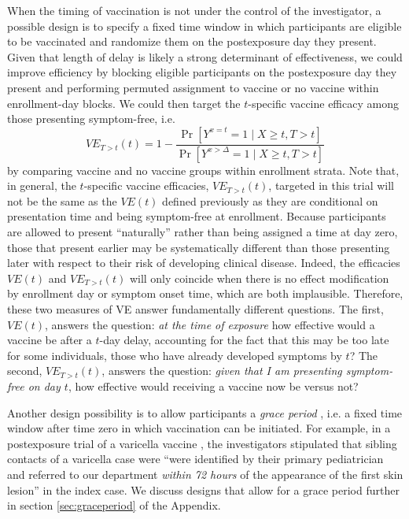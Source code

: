 \documentclass[11pt]{article}
\begin{document}
When the timing of vaccination is not under the  control of the investigator, a possible design is to specify a fixed time window in which participants are eligible to be vaccinated and randomize them on the postexposure day they present. Given that length of delay is likely a strong determinant of effectiveness, we could improve efficiency by blocking eligible participants on the postexposure day they present and performing permuted assignment to vaccine or no vaccine within enrollment-day blocks. We could then target the $t$-specific vaccine efficacy among those presenting symptom-free, i.e.
$$
VE_{T > t}(t) = 1 - \frac{\Pr[Y^{x = t} = 1 \mid X \geq t, T > t]}{\Pr[Y^{x > \Delta} = 1 \mid X \geq t, T > t]}
$$
by comparing vaccine and no vaccine groups within enrollment  strata. Note that, in general, the $t$-specific vaccine efficacies, $VE_{T > t}(t)$, targeted in this trial will not be the same as the $VE(t)$ defined previously as they are conditional on presentation time and being symptom-free at enrollment. Because participants are allowed to present ``naturally'' rather than being assigned a time at day zero, those that present earlier may be systematically different than those presenting later with respect to their risk of developing clinical disease. Indeed, the efficacies $VE(t)$ and $VE_{T > t}(t)$ will only coincide when there is no effect modification by enrollment day or symptom onset time, which are both implausible.  Therefore, these two measures of VE answer fundamentally different questions. The first, $VE(t)$, answers the question: \textit{at the time of exposure} how effective would a vaccine be after a $t$-day delay, accounting for the fact that this may be too late for some individuals, those who have already developed symptoms by $t$? The second, $VE_{T > t}(t)$, answers the question: \textit{given that I am presenting symptom-free on day $t$}, how effective would receiving a vaccine now be versus not? 

Another design possibility is to allow participants a \textit{grace period} \cite{smith_emulation_2022,wanis_role_2022}, i.e. a fixed time window after time zero in which vaccination can be initiated. For example, in a postexposure trial of a varicella vaccine \cite{mor_efficacy_2004}, the investigators stipulated that sibling contacts of a varicella case were ``were identified by their primary pediatrician and referred to our department \textit{within 72 hours} of the appearance of the first skin lesion'' in the index case. We discuss designs that allow for a grace period further in section \ref{sec:graceperiod} of the Appendix.
\end{document}
